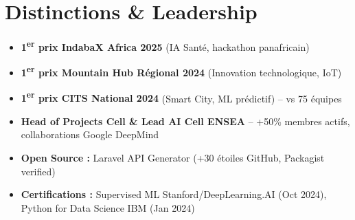 \documentclass[a4paper,11pt]{article}
\begin{document}
\section{Distinctions \& Leadership}
\begin{itemize}[leftmargin=*, label=\tiny$\bullet$, nosep]
    \item \small{\textbf{1\textsuperscript{er} prix IndabaX Africa 2025} (IA Sant\'e, hackathon panafricain)}
    \item \small{\textbf{1\textsuperscript{er} prix Mountain Hub R\'egional 2024} (Innovation technologique, IoT)}
    \item \small{\textbf{1\textsuperscript{er} prix CITS National 2024} (Smart City, ML pr\'edictif) -- vs 75 \'equipes}
    \item \small{\textbf{Head of Projects Cell \& Lead AI Cell ENSEA} -- +50\% membres actifs, collaborations Google DeepMind}
    \item \small{\textbf{Open Source :} Laravel API Generator (+30 \'etoiles GitHub, Packagist verified)}
    \item \small{\textbf{Certifications :} Supervised ML Stanford/DeepLearning.AI (Oct 2024), Python for Data Science IBM (Jan 2024)}
\end{itemize}
\end{document}
